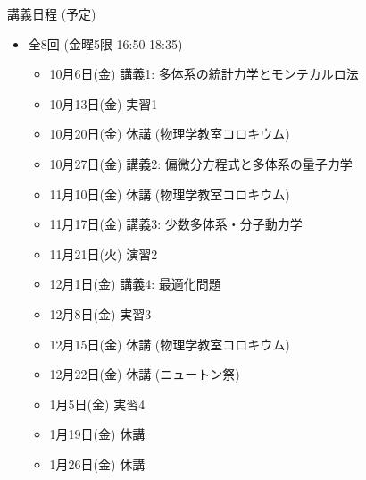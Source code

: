 \begin{frame}[t]{講義日程 (予定)}
  \begin{itemize}
  \item 全8回 (金曜5限 16:50-18:35)
    \begin{itemize}
    \item 10月6日(金) 講義1: 多体系の統計力学とモンテカルロ法
    \item 10月13日(金) 実習1
    \item {\color{gray} 10月20日(金) 休講 (物理学教室コロキウム)}
    \item 10月27日(金) 講義2: 偏微分方程式と多体系の量子力学
    \item {\color{gray} 11月10日(金) 休講 (物理学教室コロキウム)}
    \item 11月17日(金) 講義3: 少数多体系・分子動力学
    \item 11月21日{\color{red}(火)} 演習2
    \item 12月1日(金) 講義4: 最適化問題
    \item 12月8日(金) 実習3
    \item {\color{gray} 12月15日(金) 休講 (物理学教室コロキウム)}
    \item {\color{gray} 12月22日(金) 休講 (ニュートン祭)}
    \item 1月5日(金) 実習4
    \item {\color{gray} 1月19日(金) 休講}
    \item {\color{gray} 1月26日(金) 休講}
    \end{itemize}
  \end{itemize}
\end{frame}
